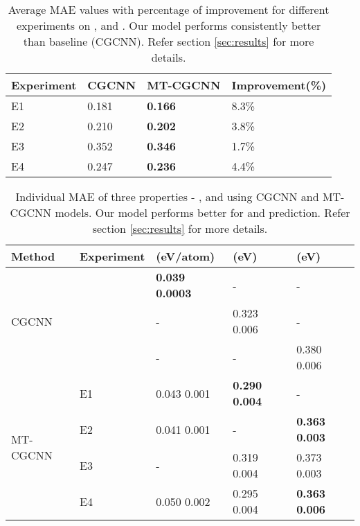 \documentclass{article}
\newcommand{\method}[1]{MT-CGCNN}
\newcommand{\baseline}[1]{CGCNN}
\newcommand{\var}{}
\newcommand{\proponesym}[1]{}
\newcommand{\proptwosym}[1]{}
\newcommand{\propthreesym}[1]{}
\begin{document}
\begin{table}[h]
	\caption{Average MAE values with percentage of improvement for different experiments on \proponesym{}, \proptwosym{} and \propthreesym{}. Our model performs consistently better than baseline (\baseline{}). Refer section \ref{sec:results} for more details.}
	\label{table:avg}
	\centering
	\begin{tabular}{llll}
		\toprule
		Experiment 			&\baseline{}	&\method{}		&Improvement(\%)	\\
		\midrule
		E1					& 0.181			&\bf{0.166}		& 8.3\%				\\
		E2					& 0.210			&\bf{0.202}		& 3.8\%				\\
		E3					& 0.352			&\bf{0.346}		& 1.7\%				\\
		E4					& 0.247			&\bf{0.236}		& 4.4\%				\\
		\bottomrule
	\end{tabular}
\end{table}

\begin{table}[h]
	\caption{Individual MAE of three properties - \proponesym{}, \proptwosym{} and \propthreesym{} using \baseline{} and \method{} models. Our model performs better for \proptwosym{} and \propthreesym{} prediction. Refer section \ref{sec:results} for more details.}
	\label{table:results}
	\centering
	\begin{tabular}{lllll}
		\toprule
		Method 							&Experiment			&\proponesym{} (eV/atom)&\proptwosym{} (eV)		&\propthreesym{} (eV)	\\
		\midrule
		\multirow{3}{*}{\baseline{}}	&\proponesym{}		&\bf{0.039} \var 0.0003	&-						&-						\\
										&\proptwosym{}		&-						&0.323 \var 0.006		&-						\\
										&\propthreesym{}	&-						&-						&0.380 \var 0.006		\\
		\midrule
		\multirow{4}{*}{\method{}}		&E1					& 0.043 \var 0.001		&\bf{0.290} \var 0.004	&-						\\
										&E2					& 0.041	\var 0.001		&-						&\bf{0.363} \var 0.003	\\
										&E3					& -						&0.319 \var 0.004		&0.373 \var 0.003		\\
										&E4					& 0.050 \var 0.002		&0.295 \var 0.004		&\bf{0.363} \var 0.006	\\
		\bottomrule
	\end{tabular}
\end{table}
\end{document}

